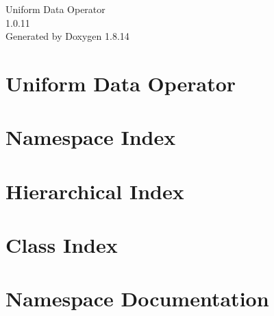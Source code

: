 \documentclass[twoside]{book}
\newcommand{\+}{\discretionary{\mbox{\scriptsize$\hookleftarrow$}}{}{}}
\newcommand{\clearemptydoublepage}{%
  \newpage{\pagestyle{empty}\cleardoublepage}%
}
\begin{document}
\hypersetup{pageanchor=false,
             bookmarksnumbered=true,
             pdfencoding=unicode
            }
\begin{titlepage}
\vspace*{7cm}
\begin{center}%
{\Large Uniform Data Operator \\[1ex]\large 1.\+0.\+11 }\\
\vspace*{1cm}
{\large Generated by Doxygen 1.8.14}\\
\end{center}
\end{titlepage}
\clearemptydoublepage
{}
\tableofcontents
\clearemptydoublepage
{}
\hypersetup{pageanchor=true}

\chapter{Uniform Data Operator}
\label{md__d_1__work__git_hub_uniform-data-operator__r_e_a_d_m_e}

\chapter{Namespace Index}

\chapter{Hierarchical Index}

\chapter{Class Index}

\chapter{Namespace Documentation}










\end{document}

